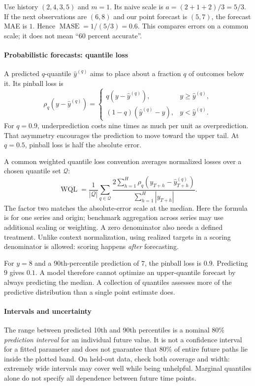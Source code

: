 \documentclass[11pt, oneside]{book}
\begin{document}
\begin{exbox}[title={A score with an interpretable scale}]
Use history $(2,4,3,5)$ and $m=1$. Its naive scale is $a=(2+1+2)/3=5/3$. If the next observations are $(6,8)$ and our point forecast is $(5,7)$, the forecast MAE is $1$. Hence $\operatorname{MASE}=1/(5/3)=0.6$. This compares errors on a common scale; it does not mean ``60 percent accurate''.
\end{exbox}

\paragraph{Probabilistic forecasts: quantile loss} A predicted $q$-quantile $\widehat y^{(q)}$ aims to place about a fraction $q$ of outcomes below it. Its pinball loss is
\[
 \rho_q(y-\widehat y^{(q)})=
 \begin{cases}
 q(y-\widehat y^{(q)}),&y\geq\widehat y^{(q)},\\
 (1-q)(\widehat y^{(q)}-y),&y<\widehat y^{(q)}.
 \end{cases}
\]
For $q=0.9$, underprediction costs nine times as much per unit as overprediction. That asymmetry encourages the prediction to move toward the upper tail. At $q=0.5$, pinball loss is half the absolute error.

A common weighted quantile loss convention averages normalized losses over a chosen quantile set $\mathcal{Q}$:
\[
 \operatorname{WQL}=\frac{1}{|\mathcal{Q}|}\sum_{q\in\mathcal{Q}}
 \frac{2\sum_{h=1}^H\rho_q(y_{T+h}-\widehat y_{T+h}^{(q)})}
 {\sum_{h=1}^H|y_{T+h}|}.
\]
The factor two matches the absolute-error scale at the median. Here the formula is for one series and origin; benchmark aggregation across series may use additional scaling or weighting. A zero denominator also needs a defined treatment. Unlike context normalization, using realized targets in a scoring denominator is allowed: scoring happens \emph{after} forecasting.

For $y=8$ and a 90th-percentile prediction of $7$, the pinball loss is $0.9$. Predicting $9$ gives $0.1$. A model therefore cannot optimize an upper-quantile forecast by always predicting the median. A collection of quantiles assesses more of the predictive distribution than a single point estimate does.

\paragraph{Intervals and uncertainty} The range between predicted 10th and 90th percentiles is a nominal 80\% \emph{prediction interval} for an individual future value. It is not a confidence interval for a fitted parameter and does not guarantee that 80\% of entire future paths lie inside the plotted band. On held-out data, check both coverage and width: extremely wide intervals may cover well while being unhelpful. Marginal quantiles alone do not specify all dependence between future time points.
\end{document}
